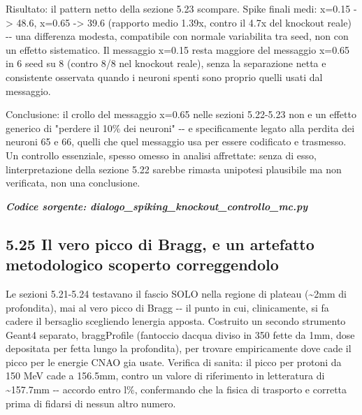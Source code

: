 \documentclass[
  italian,
]{article}
\begin{document}
Risultato: il pattern netto della sezione 5.23 scompare. Spike finali medi: x=0.15 -\textgreater{} 48.6, x=0.65 -\textgreater{} 39.6 (rapporto medio 1.39x, contro il 4.7x del knockout reale) -\/- una differenza modesta, compatibile con normale variabilita\textquotesingle{} tra seed, non con un effetto sistematico. Il messaggio x=0.15 resta maggiore del messaggio x=0.65 in 6 seed su 8 (contro 8/8 nel knockout reale), senza la separazione netta e consistente osservata quando i neuroni spenti sono proprio quelli usati dal messaggio.

Conclusione: il crollo del messaggio x=0.65 nelle sezioni 5.22-5.23 non e\textquotesingle{} un effetto generico di "perdere il 10\% dei neuroni" -\/- e\textquotesingle{} specificamente legato alla perdita dei neuroni 65 e 66, quelli che quel messaggio usa per essere codificato e trasmesso. Un controllo essenziale, spesso omesso in analisi affrettate: senza di esso, l\textquotesingle interpretazione della sezione 5.22 sarebbe rimasta un\textquotesingle ipotesi plausibile ma non verificata, non una conclusione.

\textit{\textbf{Codice sorgente: dialogo\_\allowbreak{}spiking\_\allowbreak{}knockout\_\allowbreak{}controllo\_\allowbreak{}mc.py}}


\subsection{5.25 Il vero picco di Bragg, e un artefatto metodologico scoperto correggendolo}\label{il-vero-picco-di-bragg-e-un-artefatto-metodologico-scoperto-correggendolo}

Le sezioni 5.21-5.24 testavano il fascio SOLO nella regione di plateau (\textasciitilde2mm di profondita\textquotesingle), mai al vero picco di Bragg -\/- il punto in cui, clinicamente, si fa cadere il bersaglio scegliendo l\textquotesingle energia apposta. Costruito un secondo strumento Geant4 separato, braggProfile (fantoccio d\textquotesingle acqua diviso in 350 fette da 1mm, dose depositata per fetta lungo la profondita\textquotesingle), per trovare empiricamente dove cade il picco per le energie CNAO gia\textquotesingle{} usate. Verifica di sanita\textquotesingle: il picco per protoni da 150 MeV cade a 156.5mm, contro un valore di riferimento in letteratura di \textasciitilde157.7mm -\/- accordo entro l\%, confermando che la fisica di trasporto e\textquotesingle{} corretta prima di fidarsi di nessun altro numero.
\end{document}
